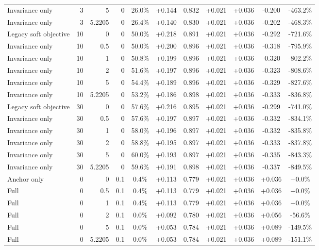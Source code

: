 \begin{table}[htbp]
\begin{tabular}{lrrrccccccc}
Invariance only & 3 & 5 & 0 & 26.0\% & +0.144 & 0.832 & +0.021 & +0.036 & -0.200 & -463.2\% \\
Invariance only & 3 & 5.2205 & 0 & 26.4\% & +0.140 & 0.830 & +0.021 & +0.036 & -0.202 & -468.3\% \\
Legacy soft objective & 10 & 0 & 0 & 50.0\% & +0.218 & 0.891 & +0.021 & +0.036 & -0.292 & -721.6\% \\
Invariance only & 10 & 0.5 & 0 & 50.0\% & +0.200 & 0.896 & +0.021 & +0.036 & -0.318 & -795.9\% \\
Invariance only & 10 & 1 & 0 & 50.8\% & +0.199 & 0.896 & +0.021 & +0.036 & -0.320 & -802.2\% \\
Invariance only & 10 & 2 & 0 & 51.6\% & +0.197 & 0.896 & +0.021 & +0.036 & -0.323 & -808.6\% \\
Invariance only & 10 & 5 & 0 & 54.4\% & +0.189 & 0.896 & +0.021 & +0.036 & -0.329 & -827.6\% \\
Invariance only & 10 & 5.2205 & 0 & 53.2\% & +0.186 & 0.898 & +0.021 & +0.036 & -0.333 & -836.8\% \\
Legacy soft objective & 30 & 0 & 0 & 57.6\% & +0.216 & 0.895 & +0.021 & +0.036 & -0.299 & -741.0\% \\
Invariance only & 30 & 0.5 & 0 & 57.6\% & +0.197 & 0.897 & +0.021 & +0.036 & -0.332 & -834.1\% \\
Invariance only & 30 & 1 & 0 & 58.0\% & +0.196 & 0.897 & +0.021 & +0.036 & -0.332 & -835.8\% \\
Invariance only & 30 & 2 & 0 & 58.8\% & +0.195 & 0.897 & +0.021 & +0.036 & -0.333 & -837.8\% \\
Invariance only & 30 & 5 & 0 & 60.0\% & +0.193 & 0.897 & +0.021 & +0.036 & -0.335 & -843.3\% \\
Invariance only & 30 & 5.2205 & 0 & 59.6\% & +0.191 & 0.898 & +0.021 & +0.036 & -0.337 & -849.5\% \\
Anchor only & 0 & 0 & 0.1 & 0.4\% & +0.113 & 0.779 & +0.021 & +0.036 & +0.036 & +0.0\% \\
Full & 0 & 0.5 & 0.1 & 0.4\% & +0.113 & 0.779 & +0.021 & +0.036 & +0.036 & +0.0\% \\
Full & 0 & 1 & 0.1 & 0.4\% & +0.113 & 0.779 & +0.021 & +0.036 & +0.036 & +0.0\% \\
Full & 0 & 2 & 0.1 & 0.0\% & +0.092 & 0.780 & +0.021 & +0.036 & +0.056 & -56.6\% \\
Full & 0 & 5 & 0.1 & 0.0\% & +0.053 & 0.784 & +0.021 & +0.036 & +0.089 & -149.5\% \\
Full & 0 & 5.2205 & 0.1 & 0.0\% & +0.053 & 0.784 & +0.021 & +0.036 & +0.089 & -151.1\% \\

\end{tabular}
\end{table}
